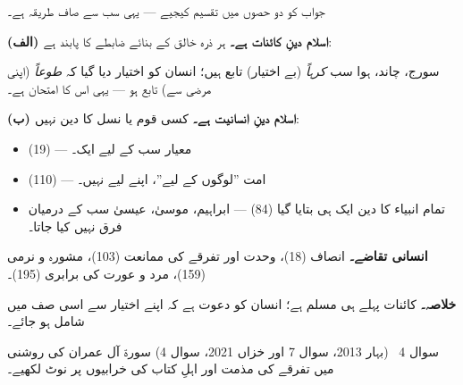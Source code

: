 \begin{hal}
جواب کو دو حصوں میں تقسیم کیجیے --- یہی سب سے صاف طریقہ ہے۔

\medskip
\textbf{(الف) اسلام دینِ کائنات ہے۔} ہر ذرہ خالق کے بنائے ضابطے کا پابند ہے:


\smallskip
سورج، چاند، ہوا سب \emph{کرہاً} (بے اختیار) تابع ہیں؛ انسان کو اختیار دیا گیا
کہ \emph{طوعاً} (اپنی مرضی سے) تابع ہو --- یہی اس کا امتحان ہے۔

\medskip
\textbf{(ب) اسلام دینِ انسانیت ہے۔} کسی قوم یا نسل کا دین نہیں:

\begin{itemize}\setlength{\itemsep}{1pt}
  \item {} (\textenglish{19}) ---
        معیار سب کے لیے ایک۔
  \item {} (\textenglish{110})
        --- امت ''لوگوں کے لیے''، اپنے لیے نہیں۔
  \item تمام انبیاء کا دین ایک ہی بتایا گیا (\textenglish{84}) --- ابراہیم،
        موسیٰ، عیسیٰ سب کے درمیان فرق نہیں کیا جاتا۔
\end{itemize}

\medskip
\textbf{انسانی تقاضے۔} انصاف (\textenglish{18})، وحدت اور تفرقے کی ممانعت
(\textenglish{103})، مشورہ و نرمی (\textenglish{159})، مرد و عورت کی برابری
(\textenglish{195})۔

\medskip
\textbf{خلاصہ۔} کائنات پہلے ہی مسلم ہے؛ انسان کو دعوت ہے کہ اپنے اختیار سے اسی
صف میں شامل ہو جائے۔
\end{hal}

\begin{sawal}{سوال \textenglish{4} \ \textnormal{\small(بہار \textenglish{2013}، سوال \textenglish{7} اور خزاں \textenglish{2021}، سوال \textenglish{4})}}
سورۃ آل عمران کی روشنی میں تفرقے کی مذمت اور اہلِ کتاب کی خرابیوں پر نوٹ لکھیے۔
\end{sawal}

